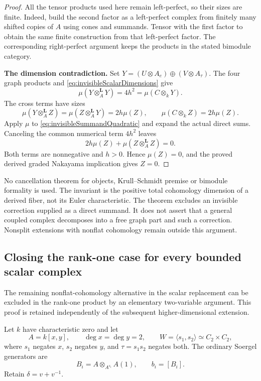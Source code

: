 \documentclass[11pt,a4paper]{article}
\theoremstyle{named}\newtheorem{finding}{Finding}[section]
\theoremstyle{definition}\newtheorem{definition}[finding]{Definition}
\theoremstyle{remark}\newtheorem{remark}[finding]{Remark}
\begin{document}
\begin{proof}
All the tensor products used here remain left-perfect,
so their sizes are finite. Indeed, build the second
factor as a left-perfect complex from finitely many
shifted copies of \(A\) using cones and summands.
Tensor with the first factor to obtain the same finite
construction from that left-perfect factor.
The corresponding right-perfect argument keeps the
products in the stated bimodule category.

\par\smallskip\noindent\textbf{The dimension contradiction.}\quad
Set \(Y=(U\otimes A_e)\oplus(V\otimes A_\tau)\).
The four graph products and
\eqref{eq:invisibleScalarDimensions} give
\[
 \mu(Y\otimes_A^{\mathbf L}Y)=4h^2
                             =\mu(C\otimes_kY).
\]
The cross terms have sizes
\[
 \mu(Y\otimes_A^{\mathbf L}Z)
    =\mu(Z\otimes_A^{\mathbf L}Y)
    =2h\mu(Z),\qquad
 \mu(C\otimes_kZ)=2h\mu(Z).
\]
Apply \(\mu\) to \eqref{eq:invisibleSummandQuadratic}
and expand the actual direct sums.
Canceling the common numerical term \(4h^2\) leaves
\[
                     2h\mu(Z)
                       +\mu(Z\otimes_A^{\mathbf L}Z)=0.
\]
Both terms are nonnegative and \(h>0\).
Hence \(\mu(Z)=0\), and the proved derived graded
Nakayama implication gives \(Z=0\).
\end{proof}

No cancellation theorem for objects, Krull--Schmidt
premise or bimodule formality is used. The invariant
is the positive total cohomology dimension of a
derived fiber, not its Euler characteristic.
The theorem excludes an invisible correction supplied
as a direct summand. It does not assert that a general
coupled complex decomposes into a free graph part and
such a correction. Nonsplit extensions with nonflat
cohomology remain outside this argument.

\subsection{Closing the rank-one case for every bounded scalar complex}

The remaining nonflat-cohomology alternative in the scalar
replacement can be excluded in the rank-one product by an
elementary two-variable argument. This proof is retained
independently of the subsequent higher-dimensional extension.

Let \(k\) have characteristic zero and let
\[
 A=k[x,y],\qquad \deg x=\deg y=2,\qquad
 W=\langle s_1,s_2\rangle\simeq C_2\times C_2,
\]
where \(s_1\) negates \(x\), \(s_2\) negates \(y\), and
\(\tau=s_1s_2\) negates both. The ordinary Soergel generators are
\[
 B_i=A\otimes_{A^{s_i}}A(1),\qquad b_i=[B_i].
\]
Retain \(\delta=v+v^{-1}\).
\end{document}
